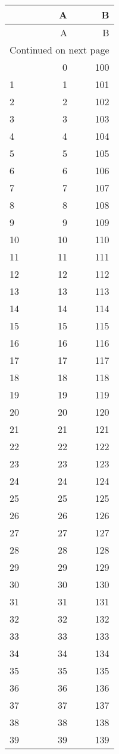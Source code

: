 \begin{longtable}{lrr}
\toprule
 & A & B \\
\midrule
\endfirsthead
\toprule
 & A & B \\
\midrule
\endhead
\midrule
\multicolumn{3}{r}{Continued on next page} \\
\midrule
\endfoot
\bottomrule
\endlastfoot
0 & 0 & 100 \\
1 & 1 & 101 \\
2 & 2 & 102 \\
3 & 3 & 103 \\
4 & 4 & 104 \\
5 & 5 & 105 \\
6 & 6 & 106 \\
7 & 7 & 107 \\
8 & 8 & 108 \\
9 & 9 & 109 \\
10 & 10 & 110 \\
11 & 11 & 111 \\
12 & 12 & 112 \\
13 & 13 & 113 \\
14 & 14 & 114 \\
15 & 15 & 115 \\
16 & 16 & 116 \\
17 & 17 & 117 \\
18 & 18 & 118 \\
19 & 19 & 119 \\
20 & 20 & 120 \\
21 & 21 & 121 \\
22 & 22 & 122 \\
23 & 23 & 123 \\
24 & 24 & 124 \\
25 & 25 & 125 \\
26 & 26 & 126 \\
27 & 27 & 127 \\
28 & 28 & 128 \\
29 & 29 & 129 \\
30 & 30 & 130 \\
31 & 31 & 131 \\
32 & 32 & 132 \\
33 & 33 & 133 \\
34 & 34 & 134 \\
35 & 35 & 135 \\
36 & 36 & 136 \\
37 & 37 & 137 \\
38 & 38 & 138 \\
39 & 39 & 139 \\

\end{longtable}
